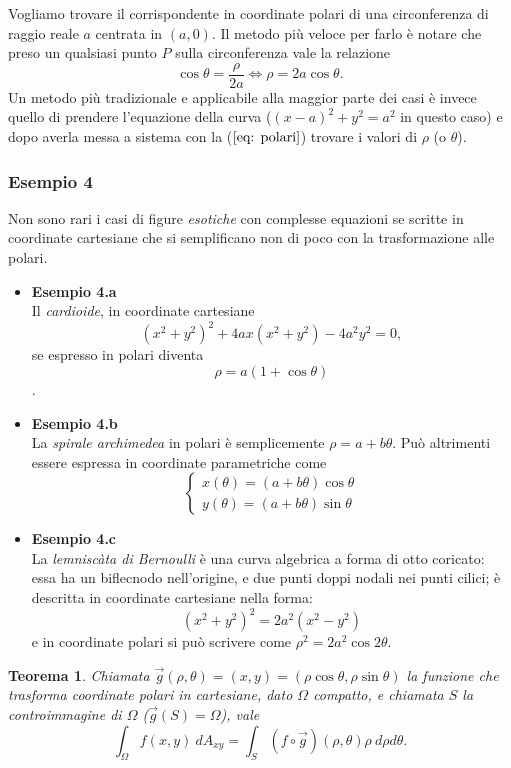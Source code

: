 \documentclass[10pt]{article}
\theoremstyle{plain}
\newtheorem{thm}{Teorema}[section]
\theoremstyle{definition}
\begin{document}
Vogliamo trovare il corrispondente in coordinate polari di una circonferenza di raggio reale $a$ centrata in $(a,0)$. Il metodo più veloce per farlo è notare che preso un qualsiasi punto $P$ sulla circonferenza vale la relazione 
$$\cos{\theta}=\frac{\rho}{2a} \Leftrightarrow \rho = 2a\cos{\theta}.$$
Un metodo più tradizionale e applicabile alla maggior parte dei casi è invece quello di prendere l'equazione della curva ($(x-a)^2+y^2=a^2$ in questo caso) e dopo averla messa a sistema con la ($\ref{eq: polari}$) trovare i valori di $\rho$ (o $\theta$).

\subsubsection{Esempio 4}
Non sono rari i casi di figure \textit{esotiche} con complesse equazioni se scritte in coordinate cartesiane che si semplificano non di poco con la trasformazione alle polari. 
\begin{itemize}
    \item \textbf{Esempio 4.a}
    \\ Il \textit{cardioide}, in coordinate cartesiane 
    $$(x^{2}+y^{2})^{2}+4ax(x^{2}+y^{2})-4a^{2}y^{2}=0, $$
    se espresso in polari diventa 
    $$\rho= a(1+\cos{\theta})$$.
    
    \item \textbf{Esempio 4.b}
    \\ La \textit{spirale archimedea} in polari è semplicemente $\rho = a+b\theta$. Può altrimenti essere espressa in coordinate parametriche come $$ \begin{cases}x(\theta )=(a+b\theta )\cos \theta \\y(\theta )=(a+b\theta )\sin \theta \end{cases}$$

    \item \textbf{Esempio 4.c}
    \\ La \textit{lemniscàta di Bernoulli} è una curva algebrica a forma di otto coricato: essa ha un biflecnodo nell'origine, e due punti doppi nodali nei punti cilici; è descritta in coordinate cartesiane nella forma:
    $$    (x^{2}+y^{2})^{2}=2a^{2}(x^{2}-y^{2})$$ e in coordinate polari si può scrivere come $ \rho^{2}=2a^{2}\cos 2\theta$.
    
\end{itemize}
\bigskip
\begin{thm}
Chiamata $\vec{g}(\rho, \theta) = (x,y) = (\rho \cos \theta, \rho \sin \theta)$ la funzione che trasforma coordinate polari in cartesiane, dato $\Omega$ compatto, e chiamata $S$ la controimmagine di $\Omega$ ($\vec{g} (S)=\Omega $), vale
$$\int_{\Omega} f(x,y)\ dA_{xy} = \int_S (f\circ \vec{g}) (\rho, \theta) \rho \ d\rho d\theta. $$
\end{thm}
\end{document}
